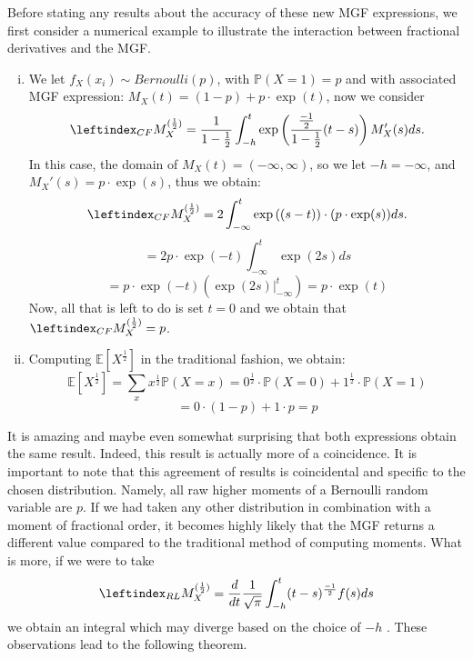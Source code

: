 Before stating any results about the accuracy of these new MGF expressions, we first consider a numerical example to illustrate the interaction between fractional derivatives and the MGF. 

\begin{example}
    \begin{enumerate}[(i)]
        \item We let \(f_X(x_i) \sim Bernoulli(p)\), with \(\mathbb{P}(X = 1) = p\) and with associated MGF expression: \(M_X(t) = (1 - p) + p \cdot\exp(t)\), now we consider \[\leftindex_{CF}{M}_X^{(\frac{1}{2})} = \frac{1}{1 - \frac{1}{2}}  \int_{-h}^{t} \exp\left(\frac{\frac{-1}{2}}{1 - \frac{1}{2}}(t-s)\right) M_X'(s) ds.\] In this case, the domain of \(M_X(t) = (-\infty, \infty)\), so we let \(-h = -\infty\), and \(M_X'(s) = p\cdot \exp(s)\), thus we obtain:
        \[\leftindex_{CF}{M}_X^{(\frac{1}{2})} = 2  \int_{-\infty}^{t} \exp\left((s-t)\right) \cdot (p\cdot \exp(s)) ds.\]
        \[= 2p \cdot \exp(-t) \int_{-\infty}^{t}\exp(2s) ds\] 
        \[= p\cdot \exp(-t) \left(\exp(2s) \Big|_{-\infty}^{t}\right) = p\cdot \exp(t)\]
        Now, all that is left to do is set \(t = 0\) and we obtain that \(\leftindex_{CF}{M}_X^{(\frac{1}{2})} = p\).
        \item Computing \(\mathbb{E}[{X^{\frac{1}{2}}}]\) in the traditional fashion, we obtain: 
        \[\mathbb{E}[{X^{\frac{1}{2}}}] = \sum_x x^{\frac{1}{2}} \mathbb{P}(X = x) = 0^{\frac{1}{2}} \cdot \mathbb{P}(X = 0) + 1^{\frac{1}{2}} \cdot \mathbb{P}(X = 1)\]
        \[ = 0 \cdot(1 - p) + 1 \cdot p = p\]
    \end{enumerate}
    
\end{example}
It is amazing and maybe even somewhat surprising that both expressions obtain the same result. Indeed, this result is actually more of a coincidence. It is important to note that this agreement of results is coincidental and specific to the chosen distribution. Namely, all raw higher moments of a Bernoulli random variable are \(p\). If we had taken any other distribution in combination with a moment of fractional order, it becomes highly likely that the MGF returns a different value compared to the traditional method of computing moments. What is more, if we were to take \[\leftindex_{RL}{M}_X^{(\frac{1}{2})}  = \frac{d}{dt} \frac{1}{\sqrt{\pi}}  \int_{-h}^{t} (t - s)^{\frac{-1}{2}} f(s) ds\] we obtain an integral which may diverge based on the choice of \(-h\) . These observations lead to the following theorem.


